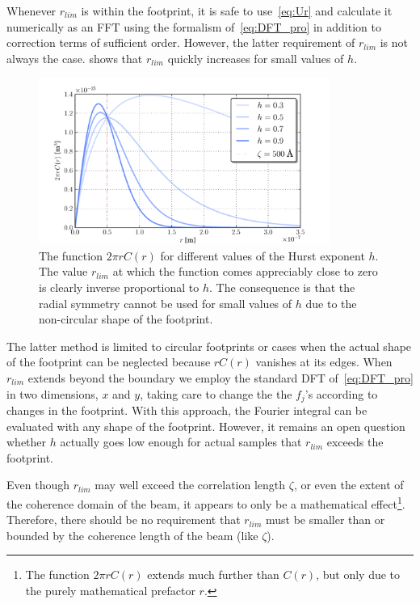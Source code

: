 \documentclass[10pt,twoside, b5paper,pdftex]{report}
\begin{document}
Whenever $r_{lim}$ is within the footprint, it is safe to use~\cref{eq:Ur} and calculate it numerically as an FFT using the formalism of~\cref{eq:DFT_pro} in addition to correction terms of sufficient order. However, the latter requirement of $r_{lim}$ is not always the case.  shows that $r_{lim}$ quickly increases for small values of $h$. 
\begin{figure}[htbp]
	\begin{center}
		\includegraphics[width=0.85\textwidth]{figures/C.pdf}		
	\end{center}
	\caption{The function $2\pi r C(r)$ for different values of the Hurst exponent $h$. The value $r_{lim}$ at which the function comes appreciably close to zero is clearly inverse proportional to $h$. The consequence is that the radial symmetry cannot be used for small values of $h$ due to the non-circular shape of the footprint. \label{fig:rcr}}
\end{figure}

The latter method is limited to circular footprints or cases when the actual shape of the footprint can be neglected because $rC(r)$ vanishes at its edges. When $r_{lim}$ extends beyond the boundary we employ the standard DFT of~\cref{eq:DFT_pro} in two dimensions, $x$ and $y$, taking care to change the the $f_j$'s according to changes in the footprint. With this approach, the Fourier integral can be evaluated with any shape of the footprint. However, it remains an open question whether $h$ actually goes low enough for actual samples that $r_{lim}$  exceeds the footprint. 

Even though $r_{lim}$ may well exceed the correlation length $\zeta$, or even the extent of the coherence domain of the beam, it appears to only be a mathematical effect\footnote{The function $2\pi rC(r)$ extends much further than $C(r)$, but only due to the purely mathematical prefactor $r$.}. Therefore, there should be no requirement that $r_{lim}$ must be smaller than or bounded by the coherence length of the beam (like $\zeta$).
\end{document}
